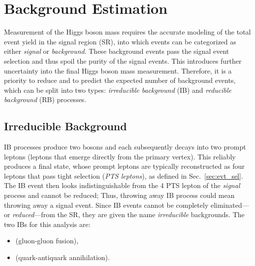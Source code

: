 \section{Background Estimation}
\label{sec:bkg_estim}
Measurement of the Higgs boson mass requires the accurate modeling of the total event yield in the signal region (SR), into which events can be categorized as either \emph{signal} or \emph{background}.
These background events pass the signal event selection
and thus spoil the purity of the signal events.
This introduces further uncertainty into the final Higgs boson mass measurement.
Therefore, it is a priority to reduce and to predict the expected number of background events, which can be split into two types: \emph{irreducible background} (IB) and \emph{reducible background} (RB) processes.

\subsection{Irreducible Background}
\label{sec:bkg_irred}
IB processes produce two \PZ bosons and each \PZ subsequently decays into two prompt leptons (leptons that emerge directly from the primary vertex).
This reliably produces a \fourl final state, whose prompt leptons are typically reconstructed as four leptons that pass tight selection (\emph{PTS leptons}), as defined in Sec.~\ref{sec:evt_sel}.
The IB event then looks indistinguishable from the 4 PTS lepton of the \emph{signal} process and cannot be reduced;
Thus, throwing away IB process could mean throwing away a signal event.
Since IB events cannot be completely eliminated---or \emph{reduced}---from the SR, they are given the name \emph{irreducible} backgrounds.
The two IBs for this analysis are:
\begin{itemize}
    \item \ggzzfourl (gluon-gluon fusion),
    \item \qqzzfourl (quark-antiquark annihilation).
\end{itemize}

